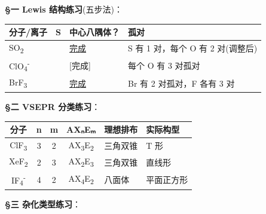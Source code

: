 \textbf{§一 Lewis 结构练习}(五步法)：

{\def\LTcaptype{none} %
\begin{longtable}[]{@{}
  >{\centering\arraybackslash}p{}
  >{\centering\arraybackslash}p{}
  >{\centering\arraybackslash}p{}
  >{\raggedright\arraybackslash}p{}@{}}
\toprule\noalign{}
\begin{minipage}[b]{\linewidth}\centering
分子/离子
\end{minipage} & \begin{minipage}[b]{\linewidth}\centering
S
\end{minipage} & \begin{minipage}[b]{\linewidth}\centering
中心八隅体？
\end{minipage} & \begin{minipage}[b]{\linewidth}\raggedright
孤对
\end{minipage} \\
\midrule\noalign{}
\endhead
\bottomrule\noalign{}
\endlastfoot
SO\textsubscript{2} & 18 & \href{3\%20个电子对区域}{完成} & S 有 1 对，每个 O 有 2 对(调整后) \\
ClO\textsubscript{4}\textsuperscript{-} & 32 & {[}完成{]} & 每个 O 有 3 对孤对 \\
BrF\textsubscript{3} & 28 & \href{5\%20个电子对区域}{完成} & Br 有 2 对孤对，F 各有 3 对 \\
\end{longtable}
}

\textbf{§二 VSEPR 分类练习}：

{\def\LTcaptype{none} %
\begin{longtable}[]{@{}ccccll@{}}
\toprule\noalign{}
分子 & n & m & AXₙEₘ & 理想排布 & 实际构型 \\
\midrule\noalign{}
\endhead
\bottomrule\noalign{}
\endlastfoot
ClF\textsubscript{3} & 3 & 2 & AX\textsubscript{3}E\textsubscript{2} & 三角双锥 & T 形 \\
XeF\textsubscript{2} & 2 & 3 & AX\textsubscript{2}E\textsubscript{3} & 三角双锥 & 直线形 \\
IF\textsubscript{4}\textsuperscript{-} & 4 & 2 & AX\textsubscript{4}E\textsubscript{2} & 八面体 & 平面正方形 \\
\end{longtable}
}

\textbf{§三 杂化类型练习}：

